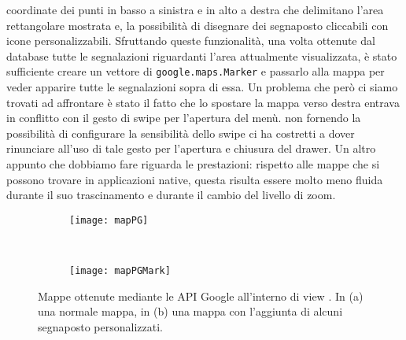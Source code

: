 			coordinate dei punti in basso a sinistra e in alto a destra che
			delimitano l'area rettangolare mostrata e, la possibilità di
			disegnare dei segnaposto cliccabili con icone personalizzabili.
			Sfruttando queste funzionalità, una volta ottenute dal database
			tutte le segnalazioni riguardanti l'area attualmente visualizzata, è
			stato sufficiente creare un vettore di \texttt{google.maps.Marker} e
			passarlo alla mappa per	veder apparire tutte le segnalazioni sopra
			di essa. Un problema che però ci siamo trovati ad affrontare è stato
			il fatto che lo spostare la mappa verso destra entrava in conflitto
			con il gesto di swipe per l'apertura del menù. \kendomob{} non
			fornendo la possibilità di configurare la sensibilità dello swipe ci
			ha costretti a dover rinunciare all'uso di tale gesto per l'apertura
			e chiusura del drawer. Un altro appunto che dobbiamo fare riguarda
			le prestazioni: rispetto alle mappe che si possono trovare in
			applicazioni native, questa risulta essere molto meno fluida durante
			il suo trascinamento e durante il cambio del livello di zoom.
			\begin{figure}[h]
				\centering
				\begin{subfigure}[b]{0.485\textwidth}
					\texttt{[image: mapPG]}
					\caption{}
					\label{fig:mapPG}
				\end{subfigure}
				~
				\begin{subfigure}[b]{0.485\textwidth}
					\texttt{[image: mapPGMark]}
					\caption{}
					\label{fig:mapPGMark}
				\end{subfigure}
				\caption{
					Mappe ottenute mediante le API Google all'interno di
					view \kendomob{}. In (a) una normale mappa, in
					(b) una mappa con l'aggiunta di alcuni
					segnaposto personalizzati.
				}
				\label{fig:PGMaps}
			\end{figure}
			
